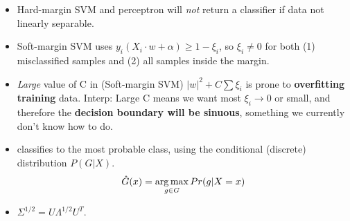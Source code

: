 \documentclass[12pt]{article}
\begin{document}
\begin{itemize}
	\item Hard-margin SVM and perceptron will \emph{not} return a classifier if data not linearly separable. 
	\item Soft-margin SVM uses $y_i (X_i \cdot w + \alpha) \ge 1 - \xi_i$, so $\xi_i \ne 0$ for both (1) misclassified samples and (2) all samples inside the margin. 
	
	\item \emph{Large} value of C in (Soft-margin SVM) $|w|^2 + C \sum \xi_i$ is prone to \textbf{overfitting training} data. Interp: Large C means we want most $\xi_i \rightarrow 0$ or small, and therefore the \textbf{decision boundary will be sinuous}, something we currently don't know how to do. 
	
	\item {} classifies to the most probable class, using the conditional (discrete) distribution $P(G|X)$. 
	\begin{align}
	\hat{G}(x) = \operatorname*{arg\,max}_{g\in G} Pr(g | X = x)
	\end{align}
	
	\item $\Sigma^{1/2} = U \Lambda^{1/2} U^T$. 
\end{itemize}
\end{document}
